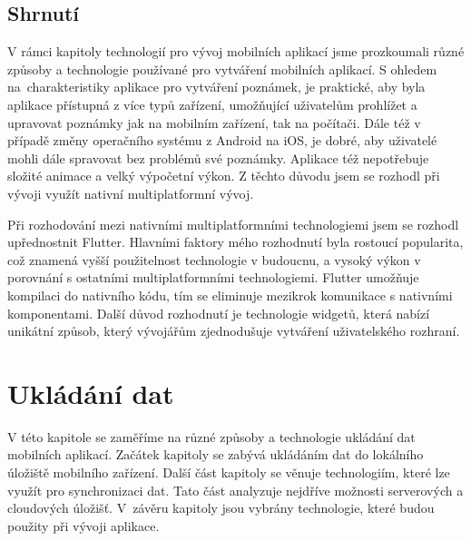 \documentclass[czech, bc, kiv, he, iso690numb]{fasthesis}
\begin{document}
\section{Shrnutí}

V rámci kapitoly technologií pro vývoj mobilních aplikací jsme prozkoumali různé způsoby a technologie používané pro vytváření mobilních aplikací. S ohledem na~charakteristiky aplikace pro vytváření poznámek, je praktické, aby byla aplikace přístupná z více typů zařízení, umožňující uživatelům prohlížet a upravovat poznámky jak na mobilním zařízení, tak na počítači. Dále též v případě změny operačního systému z Android na iOS, je dobré, aby uživatelé mohli dále spravovat bez problémů své poznámky. Aplikace též nepotřebuje složité animace a velký výpočetní výkon. Z těchto důvodu jsem se rozhodl při vývoji využít nativní multiplatformní vývoj. 

Při rozhodování mezi nativními multiplatformními technologiemi jsem se rozhodl upřednostnit Flutter. Hlavními faktory mého rozhodnutí byla rostoucí popularita, což znamená vyšší použitelnost technologie v budoucnu, a vysoký výkon v porovnání s ostatními multiplatformními technologiemi. Flutter umožňuje kompilaci do nativního kódu, tím se eliminuje mezikrok komunikace s nativními komponentami. Další důvod rozhodnutí je technologie widgetů, která nabízí unikátní způsob, který vývojářům zjednodušuje vytváření uživatelského rozhraní.


%
%
%
%

\chapter{Ukládání dat} \label{chap:data}

V této kapitole se zaměříme na různé způsoby a technologie ukládání dat mobilních aplikací. Začátek kapitoly se zabývá ukládáním dat do lokálního úložiště mobilního zařízení. Další část kapitoly se věnuje technologiím, které lze využít pro synchronizaci dat. Tato část analyzuje nejdříve možnosti serverových a cloudových úložišť. V~závěru kapitoly jsou vybrány technologie, které budou použity při vývoji aplikace. %
\end{document}
